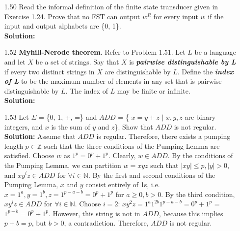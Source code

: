 \begin{enumerate}
\item[1.50]Read the informal definition of the finite state transducer given in Exercise 1.24. Prove that no FST can output $w^R$ for every input $w$ if the input and output alphabets are \{0, 1\}.
\\
\textbf{Solution:} \alreadyanswered

\item[1.52]\textbf{Myhill-Nerode theorem}. Refer to Problem 1.51. Let $L$ be a language and let $X$ be a set of strings. Say that $X$ is \textbf{\emph{pairwise distinguishable by L}} if every two distinct strings in $X$ are distinguishable by $L$. Define the \textbf{\emph{index of L}} to be the maximum number of elements in any set that is pairwise distinguishable by $L$. The index of $L$ may be finite or infinite.
\\
\textbf{Solution:} \alreadyanswered

\item[1.53]Let $\Sigma$ = \{0, 1, +, =\} and $ADD$ = \{ $x = y + z$ $|$ $x, y, z$ are binary integers, and $x$ is the sum of $y$ and $z$\}. Show that $ADD$ is not regular.
\\
\textbf{Solution:} Assume that $ADD$ is regular. Therefore, there exists a pumping length $p \in \mathbb{Z}$ such that the three conditions of the Pumping Lemma are satisfied. Choose $w$ as $1^p=0^p+1^p$. Clearly, $w \in ADD$. By the conditions of the Pumping Lemma, we can partition $w = xyz$ such that $|xy| \le p, |y| > 0$, and $xy^iz \in ADD$ for $\forall i \in \mathbb{N}$. By the first and second conditions of the Pumping Lemma, $x$ and $y$ consist entirely of 1s, i.e. $x = 1^a, y = 1^b, z = 1^{p-a-b}=0^p+1^p$ for $a \ge 0, b > 0$. By the third condition, $xy^iz \in ADD$ for $\forall i \in \mathbb{N}$. Choose $i=2$: $xy^2z = 1^a1^{2b}1^{p-a-b}=0^p+1^p$ = $1^{p+b}=0^p+1^p$. However, this string is not in $ADD$, because this implies $p+b = p$, but $b > 0$, a contradiction. Therefore, $ADD$ is not regular.


\end{enumerate}
